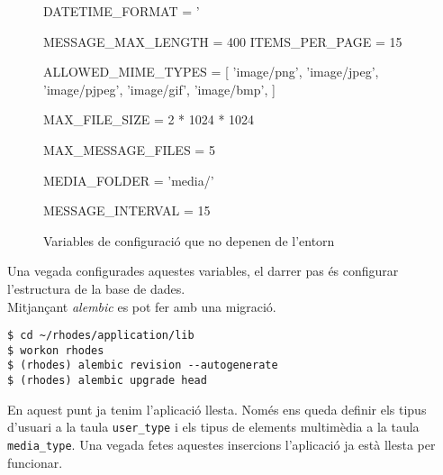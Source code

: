 \begin{figure}[h!]
	\begin{python}
	
DATETIME_FORMAT = '%

MESSAGE_MAX_LENGTH = 400
ITEMS_PER_PAGE = 15

ALLOWED_MIME_TYPES = [
    'image/png',
    'image/jpeg',
    'image/pjpeg',
    'image/gif',
    'image/bmp',
]

MAX_FILE_SIZE = 2 * 1024 * 1024

MAX_MESSAGE_FILES = 5

MEDIA_FOLDER = 'media/'

MESSAGE_INTERVAL = 15
	\end{python}
	\caption{Variables de configuració que no depenen de l'entorn}
	\label{fig:variables_no_entorn}
\end{figure}

Una vegada configurades aquestes variables, el darrer pas és configurar l'estructura de la base de dades.\\

Mitjançant \emph{alembic} es pot fer amb una migració.
\begin{verbatim}
$ cd ~/rhodes/application/lib
$ workon rhodes
$ (rhodes) alembic revision --autogenerate
$ (rhodes) alembic upgrade head
\end{verbatim}

En aquest punt ja tenim l'aplicació llesta. Només ens queda definir els tipus d'usuari a la taula \texttt{user\_type} i els tipus de elements multimèdia a la taula \texttt{media\_type}. Una vegada fetes aquestes insercions l'aplicació ja està llesta per funcionar.

